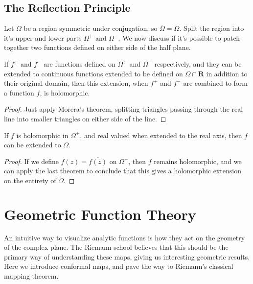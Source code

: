 \section{The Reflection Principle}

Let $\Omega$ be a region symmetric under conjugation, so $\overline{\Omega} = \Omega$. Split the region into it's upper and lower parts $\Omega^+$ and $\Omega^-$. We now discuss if it's possible to patch together two functions defined on either side of the half plane.

\begin{theorem}
    If $f^+$ and $f^-$ are functions defined on $\Omega^+$ and $\Omega^-$ respectively, and they can be extended to continuous functions extended to be defined on $\Omega \cap \mathbf{R}$ in addition to their original domain, then this extension, when $f^+$ and $f^-$ are combined to form a function $f$, is holomorphic.
\end{theorem}
\begin{proof}
    Just apply Morera's theorem, splitting triangles passing through the real line into smaller triangles on either side of the line.
\end{proof}

\begin{theorem}
    If $f$ is holomorphic in $\Omega^+$, and real valued when extended to the real axis, then $f$ can be extended to $\Omega$.
\end{theorem}
\begin{proof}
    If we define $f(z) = \overline{f(\overline{z})}$ on $\Omega^-$, then $f$ remains holomorphic, and we can apply the last theorem to conclude that this gives a holomorphic extension on the entirety of $\Omega$.
\end{proof}


\chapter{Geometric Function Theory}

An intuitive way to visualize analytic functions is how they act on the geometry of the complex plane. The Riemann school believes that this should be the primary way of understanding these maps, giving us interesting geometric results. Here we introduce conformal maps, and pave the way to Riemann's classical mapping theorem.

